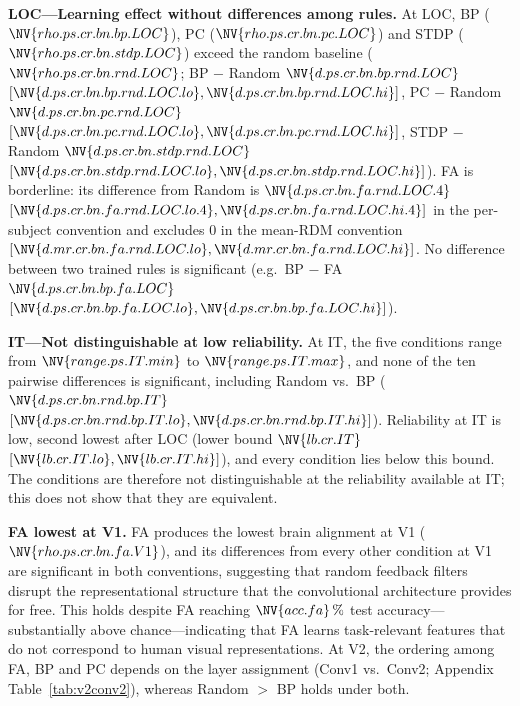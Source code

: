\documentclass[10pt,twocolumn]{article}
\newcommand{\rs}[2]{\NV{rho.ps.cr.bn.#1.#2}}
\newcommand{\dps}[3]{\NV{d.ps.cr.bn.#1.#2.#3}}
\newcommand{\dpsci}[3]{[\NV{d.ps.cr.bn.#1.#2.#3.lo},\NV{d.ps.cr.bn.#1.#2.#3.hi}]}
\newcommand{\dmrci}[3]{[\NV{d.mr.cr.bn.#1.#2.#3.lo},\NV{d.mr.cr.bn.#1.#2.#3.hi}]}
\newcommand{\dpsciF}[3]{[\NV{d.ps.cr.bn.#1.#2.#3.lo.4},\NV{d.ps.cr.bn.#1.#2.#3.hi.4}]}
\newcommand{\lb}[1]{\NV{lb.cr.#1}}
\newcommand{\lbci}[1]{[\NV{lb.cr.#1.lo},\NV{lb.cr.#1.hi}]}
\begin{document}
\textbf{LOC---Learning effect without differences among rules.} At LOC, BP ($\rs{bp}{LOC}$), PC ($\rs{pc}{LOC}$) and STDP ($\rs{stdp}{LOC}$) exceed the random baseline ($\rs{rnd}{LOC}$; BP $-$ Random $\dps{bp}{rnd}{LOC}$ $\dpsci{bp}{rnd}{LOC}$, PC $-$ Random $\dps{pc}{rnd}{LOC}$ $\dpsci{pc}{rnd}{LOC}$, STDP $-$ Random $\dps{stdp}{rnd}{LOC}$ $\dpsci{stdp}{rnd}{LOC}$). FA is borderline: its difference from Random is $\NV{d.ps.cr.bn.fa.rnd.LOC.4}$ $\dpsciF{fa}{rnd}{LOC}$ in the per-subject convention and excludes 0 in the mean-RDM convention $\dmrci{fa}{rnd}{LOC}$. No difference between two trained rules is significant (e.g.\ BP $-$ FA $\dps{bp}{fa}{LOC}$ $\dpsci{bp}{fa}{LOC}$).

\textbf{IT---Not distinguishable at low reliability.} At IT, the five conditions range from $\NV{range.ps.IT.min}$ to $\NV{range.ps.IT.max}$, and none of the ten pairwise differences is significant, including Random vs.\ BP ($\dps{rnd}{bp}{IT}$ $\dpsci{rnd}{bp}{IT}$). Reliability at IT is low, second lowest after LOC (lower bound $\lb{IT}$ $\lbci{IT}$), and every condition lies below this bound. The conditions are therefore not distinguishable at the reliability available at IT; this does not show that they are equivalent.

\textbf{FA lowest at V1.} FA produces the lowest brain alignment at V1 ($\rs{fa}{V1}$), and its differences from every other condition at V1 are significant in both conventions, suggesting that random feedback filters disrupt the representational structure that the convolutional architecture provides for free. This holds despite FA reaching $\NV{acc.fa}\,\%$ test accuracy---substantially above chance---indicating that FA learns task-relevant features that do not correspond to human visual representations. At V2, the ordering among FA, BP and PC depends on the layer assignment (Conv1 vs.\ Conv2; Appendix Table~\ref{tab:v2conv2}), whereas Random $>$ BP holds under both.

\begin{table}[t]
\centering
\caption{RSA scores $\rho_{\text{subj}}$ (per-subject convention; mean across 5 seeds) with stimulus-bootstrap 95\% CI, cross-run stimulus pairs, repaired model set, $224\times224$ input. The mean-RDM convention is in the appendix (Table~\ref{tab:rsa_mr}). Lower bound: \citet{nili2014} leave-one-subject-out. Bold: highest $\rho_{\text{subj}}$ per ROI (V1, V2, LOC). $^{\dagger}$: difference from Random Weights significant (CI excludes 0). $^{\ddagger}$: at IT no pairwise difference is significant; no condition is marked.}
\label{tab:rsa}
\small
\resizebox{\textwidth}{!}{%
}%
\end{table}
\end{document}
